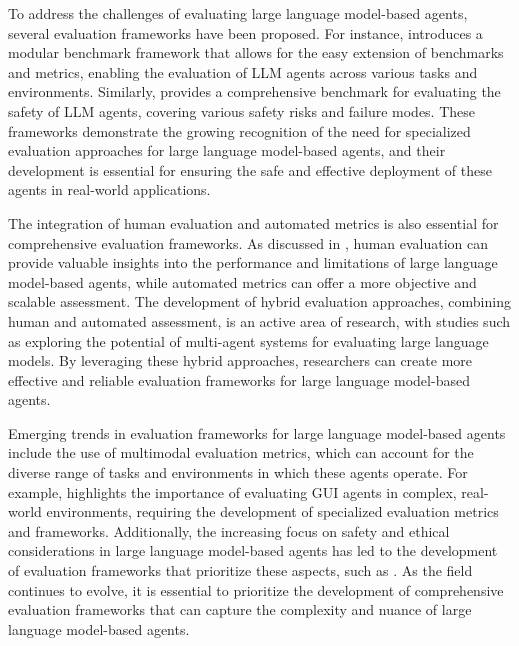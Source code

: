 \documentclass[11pt,a4paper]{article}
\begin{document}
To address the challenges of evaluating large language model-based agents, several evaluation frameworks have been proposed. For instance, \cite{arxiv:2404.06411} introduces a modular benchmark framework that allows for the easy extension of benchmarks and metrics, enabling the evaluation of LLM agents across various tasks and environments. Similarly, \cite{arxiv:2412.14470} provides a comprehensive benchmark for evaluating the safety of LLM agents, covering various safety risks and failure modes. These frameworks demonstrate the growing recognition of the need for specialized evaluation approaches for large language model-based agents, and their development is essential for ensuring the safe and effective deployment of these agents in real-world applications.

The integration of human evaluation and automated metrics is also essential for comprehensive evaluation frameworks. As discussed in \cite{doi:10.1007/s11704-024-40231-1}, human evaluation can provide valuable insights into the performance and limitations of large language model-based agents, while automated metrics can offer a more objective and scalable assessment. The development of hybrid evaluation approaches, combining human and automated assessment, is an active area of research, with studies such as \cite{arxiv:2404.01023} exploring the potential of multi-agent systems for evaluating large language models. By leveraging these hybrid approaches, researchers can create more effective and reliable evaluation frameworks for large language model-based agents.

Emerging trends in evaluation frameworks for large language model-based agents include the use of multimodal evaluation metrics, which can account for the diverse range of tasks and environments in which these agents operate. For example, \cite{arxiv:2411.04890} highlights the importance of evaluating GUI agents in complex, real-world environments, requiring the development of specialized evaluation metrics and frameworks. Additionally, the increasing focus on safety and ethical considerations in large language model-based agents has led to the development of evaluation frameworks that prioritize these aspects, such as \cite{arxiv:2412.14470}. As the field continues to evolve, it is essential to prioritize the development of comprehensive evaluation frameworks that can capture the complexity and nuance of large language model-based agents.
\end{document}

